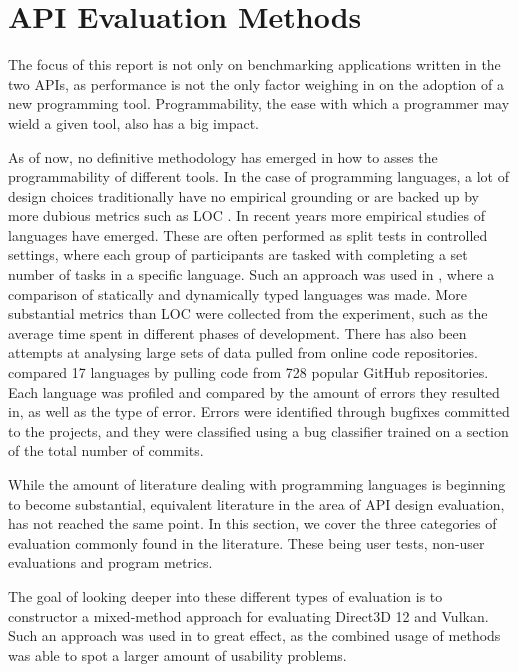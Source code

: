 \section{\gls{API} Evaluation Methods}\label{sec:apimethods}
The focus of this report is not only on benchmarking applications written in the two \glspl{API}, as performance is not the only factor weighing in on the adoption of a new programming tool.
Programmability, the ease with which a programmer may wield a given tool, also has a big impact.

As of now, no definitive methodology has emerged in how to asses the programmability of different tools.
In the case of programming languages, a lot of design choices traditionally have no empirical grounding or are backed up by more dubious metrics such as \gls{LOC} \cite{markstrum2010staking}.
In recent years more empirical studies of languages have emerged.
These are often performed as split tests in controlled settings, where each group of participants are tasked with completing a set number of tasks in a specific language.
Such an approach was used in \citet{hanenberg2010experiment}, where a comparison of statically and dynamically typed languages was made. 
More substantial metrics than \gls{LOC} were collected from the experiment, such as the average time spent in different phases of development.
There has also been attempts at analysing large sets of data pulled from online code repositories.
\citet{ray2014large} compared 17 languages by pulling code from 728 popular GitHub repositories.
Each language was profiled and compared by the amount of errors they resulted in, as well as the type of error.
Errors were identified through bugfixes committed to the projects, and they were classified using a bug classifier trained on a section of the total number of commits.  

While the amount of literature dealing with programming languages is beginning to become substantial, equivalent literature in the area of \gls{API} design evaluation, has not reached the same point.
In this section, we cover the three categories of evaluation commonly found in the literature.
These being user tests, non-user evaluations and program metrics.     

The goal of looking deeper into these different types of evaluation is to constructor a mixed-method approach for evaluating Direct3D 12 and Vulkan.
Such an approach was used in \citet{grill2012methods, beaton2008usability} to great effect, as the combined usage of methods was able to spot a larger amount of usability problems.

